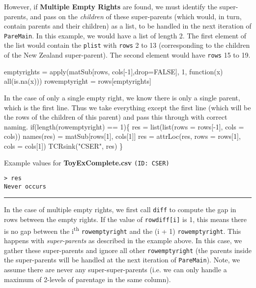 \documentclass[a4paper]{article}
\begin{document}
\begin{table}[!h]
\begin{minipage}{0.6\linewidth}
  However, if \textbf{Multiple Empty Rights} are found, we must
  identify the super-parents, and pass on the \emph{children} of these
  super-parents (which would, in turn, contain parents and their
  children) as a list, to be handled in the next iteration of
  \verb|PareMain|. In this example, we would have a list of length
  2. The first element of the list would contain the \verb|plist| with
  \verb|rows| 2 to 13 (corresponding to the children of the New
  Zealand super-parent). The second element would have \verb|rows| 15
  to 19.
\end{minipage}
\end{table}

\nwenddocs{}\endmoddef
emptyrights = apply(matSub[rows, cols[-1],drop=FALSE], 1,
  function(x) all(is.na(x)))
rowemptyright = rows[emptyrights]
\nwendcode{}\nwdocspar

In the case of only a single empty right, we know there is only a
single parent, which is the first line. Thus we take everything except
the first line (which will be the rows of the children of this parent)
and pass this through with correct naming.
\nwenddocs{}\endmoddef
if(length(rowemptyright) == 1)\{
  res = list(list(rows = rows[-1], cols = cols))
  names(res) = matSub[rows[1], cols[1]]
  res = attrLoc(res, rows = rows[1], cols = cols[1])
  TCRsink("CSER", res)
\}
\nwendcode{}\nwdocspar

Example values for \textbf{ToyExComplete.csv} \texttt{(ID: CSER)}
\begin{verbatim}
> res
Never occurs
\end{verbatim}
\vspace{-1.5em}
\noindent\rule{0.25\textwidth}{0.4pt}
\vspace{0.5em}

In the case of multiple empty rights, we first call \verb|diff| to
compute the gap in rows between the empty rights. If the value of
\verb|rowdiff[i]| is 1, this means there is no gap between the
i\textsuperscript{th} \verb|rowemptyright| and the (i + 1)
\verb|rowemptyright|. This happens with \emph{super-parents} as
described in the example above. In this case, we gather these
super-parents and ignore all other \verb|rowemptyright| (the parents
inside the super-parents will be handled at the next iteration of
\verb|PareMain|). Note, we assume there are never any
super-super-parents (i.e. we can only handle a maximum of 2-levels of
parentage in the same column).
\end{document}

